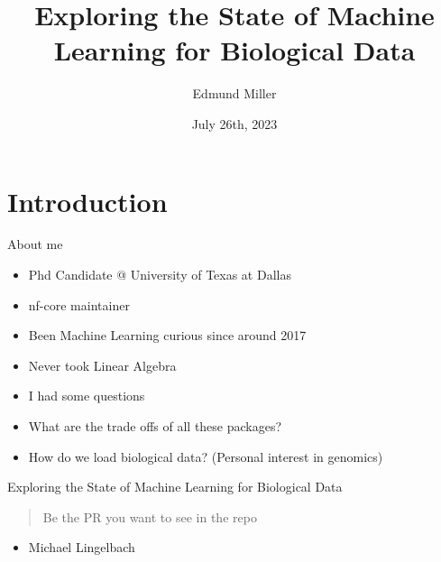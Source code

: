 \documentclass[bigger]{beamer}
\author{Edmund Miller}
\date{July 26th, 2023}
\title{Exploring the State of Machine Learning for Biological Data}
\begin{document}
\maketitle

\section*{Introduction}
\label{sec:org0eeca97}
\begin{frame}[label={sec:orgdfcf7b2}]{About me}
\begin{itemize}
\item Phd Candidate @ University of Texas at Dallas
\item nf-core maintainer
\end{itemize}

\pause

\begin{itemize}
\item Been Machine Learning curious since around 2017
\end{itemize}
\pause
\begin{itemize}
\item Never took Linear Algebra
\end{itemize}

\pause

\begin{itemize}
\item I had some questions
\end{itemize}
\pause
\begin{itemize}
\item What are the trade offs of all these packages?
\end{itemize}
\pause
\begin{itemize}
\item How do we load biological data? (Personal interest in genomics)
\end{itemize}
\end{frame}

\begin{frame}[label={sec:org242b94d}]{Exploring the State of Machine Learning for Biological Data}
\begin{quote}
Be the PR you want to see in the repo
\end{quote}
\begin{itemize}
\item Michael Lingelbach
\end{itemize}
\end{frame}
\end{document}
